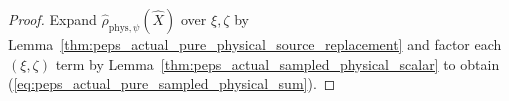 \begin{proof}
    \leanok
    Expand $\widehat\rho_{\mathrm{phys},\psi}(\widehat X)$ over $\xi,\zeta$ by
    Lemma~\ref{thm:peps_actual_pure_physical_source_replacement} and factor each
    $(\xi,\zeta)$ term by Lemma~\ref{thm:peps_actual_sampled_physical_scalar}
    to obtain (\ref{eq:peps_actual_pure_sampled_physical_sum}).
\end{proof}
